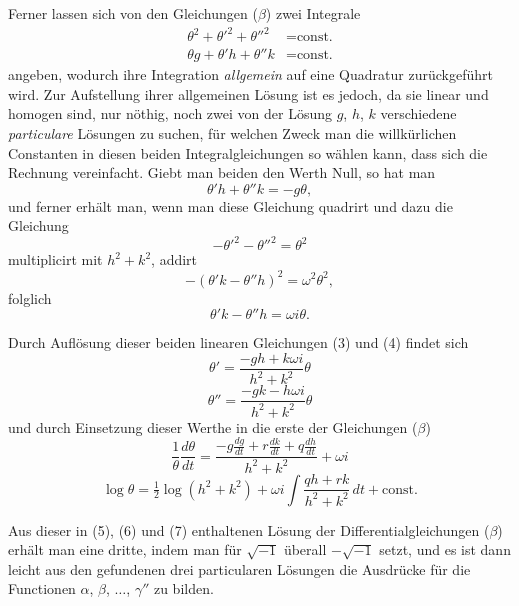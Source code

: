 \documentclass[12pt,a4paper]{article}
\begin{document}
Ferner lassen sich von den Gleichungen ($\beta$) zwei Integrale
\begin{align*}
\tag{IV} \theta^2 + \theta'^2 + \theta''^2 &= \text{const.}\\
\tag{V} \theta g + \theta'h + \theta''k &= \text{const.}
\end{align*}
angeben, wodurch ihre Integration \textit{allgemein} auf eine Quadratur zurückgeführt wird. Zur Aufstellung ihrer allgemeinen Lösung ist es jedoch, da sie linear und homogen sind, nur nöthig, noch zwei von der Lösung $g$, $h$, $k$ verschiedene \textit{particulare} Lösungen zu suchen, für welchen Zweck man die willkürlichen Constanten in diesen beiden Integralgleichungen so wählen kann, dass sich die Rechnung vereinfacht. Giebt man beiden den Werth Null, so hat man
\begin{equation}
\tag{3} \theta'h + \theta''k = -g\theta,
\end{equation}
und ferner erhält man, wenn man diese Gleichung quadrirt und dazu die Gleichung
\[
-\theta'^2 - \theta''^2 = \theta^2
\]
multiplicirt mit $h^2 + k^2$, addirt
\[
-(\theta'k - \theta''h)^2 = \omega^2\theta^2,
\]
folglich
\begin{equation}
\tag{4} \theta'k - \theta''h = \omega i\theta.
\end{equation}

Durch Auflösung dieser beiden linearen Gleichungen (3) und (4) findet sich
\begin{equation}
\tag{5} \theta' = \frac{-gh + k\omega i}{h^2 + k^2}\theta
\end{equation}
\begin{equation}
\tag{6} \theta'' = \frac{-gk - h\omega i}{h^2 + k^2}\theta
\end{equation}
und durch Einsetzung dieser Werthe in die erste der Gleichungen ($\beta$)
\[
\frac{1}{\theta}\frac{d\theta}{dt} = \frac{-g\frac{dg}{dt} + r\frac{dk}{dt} + q\frac{dh}{dt}}{h^2 + k^2} + \omega i
\]
\begin{equation}
\tag{7} \log\theta = \tfrac{1}{2}\log(h^2 + k^2) + \omega i\int\!\frac{qh + rk}{h^2 + k^2}\,dt + \text{const.}
\end{equation}

Aus dieser in (5), (6) und (7) enthaltenen Lösung der Differentialgleichungen ($\beta$) erhält man eine dritte, indem man für $\sqrt{-1}$ überall $-\sqrt{-1}$ setzt, und es ist dann leicht aus den gefundenen drei particularen Lösungen die Ausdrücke für die Functionen $\alpha$, $\beta$, $\ldots$, $\gamma''$ zu bilden.
\end{document}
